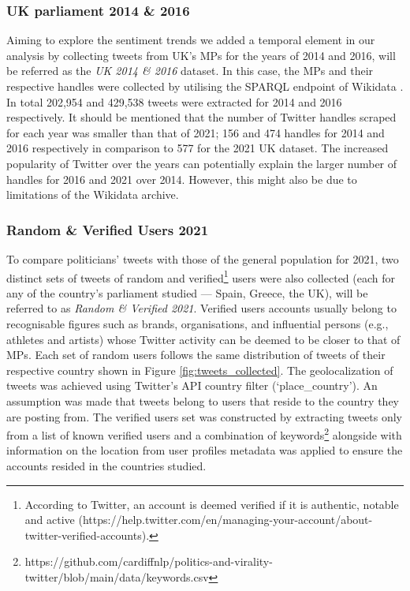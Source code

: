\subsubsection{UK parliament 2014 \& 2016}\label{sec:temporal_data}

Aiming to explore the sentiment trends we added a temporal element in our analysis by collecting tweets from UK's \acp{MP} for the years of 2014 and 2016, will be referred as the \textit{UK 2014 \& 2016} dataset. In this case, the \acp{MP} and their respective handles were collected by utilising the SPARQL \cite{SPARQL1113:online} endpoint  of Wikidata \cite{wikidata}. In total 202,954 and 429,538 tweets were extracted for 2014 and 2016 respectively. It should be mentioned that the number of Twitter handles scraped for each year was smaller than that of 2021; 156 and 474 handles for 2014 and 2016 respectively in comparison to 577 for the 2021 UK dataset. The increased popularity of Twitter over the years can potentially explain the larger number of handles for 2016 and 2021 over 2014. However, this might also be due to limitations of the Wikidata archive. 

\subsubsection{Random \& Verified Users 2021}\label{sec:random&verified} To compare politicians' tweets with those of the general population for 2021, two distinct sets of tweets of random and verified\footnote{According to Twitter, an account is deemed verified if it is authentic, notable and active (https://help.twitter.com/en/managing-your-account/about-twitter-verified-accounts).} users were also collected (each for any of the country's parliament studied --- Spain, Greece, the UK), will be referred  to as \textit{Random \& Verified 2021}. Verified users accounts usually belong to recognisable figures such as brands, organisations, and influential persons (e.g., athletes and artists) whose Twitter activity can be deemed to be closer to that of \acp{MP}. Each set of random users follows the same distribution of tweets of their respective country shown in Figure \ref{fig:tweets_collected}. The geolocalization of tweets was achieved using Twitter's \ac{API} country filter (`place\_country'). An assumption was made that tweets belong to users that reside to the country they are posting from.
The verified users set was constructed by extracting tweets only from a list of known verified users and a combination of keywords\footnote{https://github.com/cardiffnlp/politics-and-virality-twitter/blob/main/data/keywords.csv} alongside with information on the location from user profiles metadata was applied to ensure the accounts resided in the countries studied.


